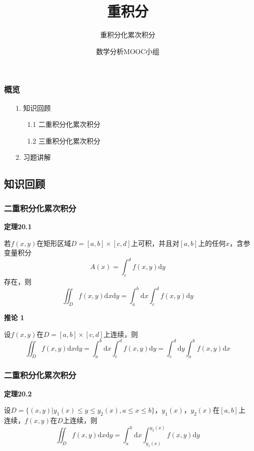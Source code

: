 \documentclass[xetex]{beamer}
\begin{document}
	\begin{frame}
		\title{重积分}
		\subtitle{重积分化累次积分}
		\author{数学分析MOOC小组}
		\date{ }
		\titlepage
	\end{frame}
	
	\begin{frame}
		\frametitle{概览}
		\begin{itemize}
			\item[1.] 知识回顾
				\begin{itemize}
					\item[1.1] 二重积分化累次积分
					\item[1.2] 三重积分化累次积分
				\end{itemize}			
			\item[2.] 习题讲解
		\end{itemize}
	\end{frame}
	
	\begin{frame}
		\section{知识回顾}
	\end{frame}
	
	\begin{frame}
		\frametitle{二重积分化累次积分}
		\textbf{定理20.1}
			
			若$f(x,y)$在矩形区域$D = [a, b] \times [c, d]$上可积，并且对$[a,b]$上的任何$x$，含参变量积分
			\begin{equation*}
				A(x) = \int_{c}^{d} f(x,y) \mathrm{d} y
			\end{equation*}
			存在，则
			\begin{equation*}
				\iint_{D} f(x, y) \mathrm{d} x \mathrm{d} y = \int_{a}^{b} \mathrm{d} x \int_{c}^{d} f(x, y) \mathrm{d} y
			\end{equation*}
		
		\textbf{推论 1}
		
			设$f(x,y)$在$D = [a, b] \times [c, d]$上连续，则
			\begin{equation*}
				\iint_{D} f(x, y) \mathrm{d} x \mathrm{d} y = \int_{a}^{b} \mathrm{d} x \int_{c}^{d} f(x, y) \mathrm{d} y =  \int_{c}^{d} \mathrm{d} y \int_{a}^{b} f(x, y) \mathrm{d} x
			\end{equation*}
	\end{frame}
	
	\begin{frame}
		\frametitle{二重积分化累次积分}
		\textbf{定理20.2}
		
			设$D = \{(x,y) | y_1(x) \leq y \leq y_2(x), a \leq x \leq b \}$，$y_1(x)$，$y_2(x)$在$[a, b]$上连续，$f(x,y)$在$D$上连续，则
			\begin{equation*}
				\iint_{D} f(x, y) \mathrm{d} x \mathrm{d} y = \int_{a}^{b} \mathrm{d} x \int_{y_1(x)}^{y_2(x)} f(x, y) \mathrm{d} y
			\end{equation*}
	\end{frame}
	
\end{document}
